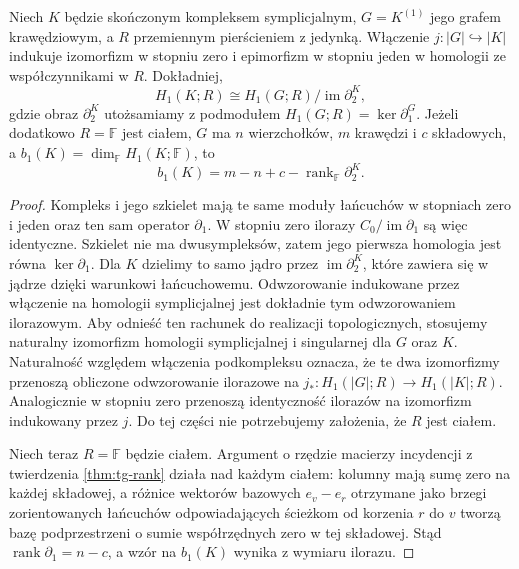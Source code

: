 \begin{stwierdzenie}
\label{prop:tg-skeleton-homology}
Niech $K$ będzie skończonym kompleksem symplicjalnym,
$G=K^{(1)}$ jego grafem krawędziowym, a $R$
przemiennym pierścieniem z jedynką.
Włączenie $j:|G|\hookrightarrow |K|$
indukuje izomorfizm w stopniu zero i epimorfizm
w stopniu jeden w homologii ze współczynnikami w $R$.
Dokładniej,
\[
H_1(K;R)\cong H_1(G;R)/\operatorname{im}\partial_2^K,
\]
gdzie obraz $\partial_2^K$ utożsamiamy z podmodułem
$H_1(G;R)=\ker\partial_1^G$.
Jeżeli dodatkowo $R=\mathbb F$ jest ciałem,
$G$ ma $n$ wierzchołków, $m$ krawędzi i $c$ składowych,
a $b_1(K)=\dim_{\mathbb F}H_1(K;\mathbb F)$, to
\[
b_1(K)=m-n+c-\operatorname{rank}_{\mathbb F}\partial_2^K.
\]
\end{stwierdzenie}
\begin{proof}
Kompleks i jego szkielet mają te same moduły
łańcuchów w stopniach zero i jeden oraz ten sam
operator $\partial_1$. W stopniu zero ilorazy
$C_0/\operatorname{im}\partial_1$ są więc identyczne.
Szkielet nie ma dwusympleksów, zatem jego pierwsza
homologia jest równa $\ker\partial_1$.
Dla $K$ dzielimy to samo jądro przez
$\operatorname{im}\partial_2^K$, które zawiera się
w jądrze dzięki warunkowi łańcuchowemu.
Odwzorowanie indukowane przez włączenie
na homologii symplicjalnej jest dokładnie tym
odwzorowaniem ilorazowym. Aby odnieść ten rachunek
do realizacji topologicznych, stosujemy naturalny
izomorfizm homologii symplicjalnej i singularnej
dla $G$ oraz $K$. Naturalność względem włączenia
podkompleksu oznacza, że te dwa izomorfizmy
przenoszą obliczone odwzorowanie ilorazowe na
$j_*:H_1(|G|;R)\to H_1(|K|;R)$.
Analogicznie w stopniu zero przenoszą identyczność
ilorazów na izomorfizm indukowany przez $j$.
Do tej części nie potrzebujemy założenia, że $R$
jest ciałem.

Niech teraz $R=\mathbb F$ będzie ciałem.
Argument o rzędzie macierzy incydencji
z twierdzenia \ref{thm:tg-rank} działa nad każdym
ciałem: kolumny mają sumę zero na każdej składowej,
a różnice wektorów bazowych $e_v-e_r$ otrzymane
jako brzegi zorientowanych łańcuchów odpowiadających
ścieżkom od korzenia $r$ do $v$ tworzą bazę
podprzestrzeni o sumie współrzędnych zero w tej
składowej. Stąd $\operatorname{rank}\partial_1=n-c$,
a wzór na $b_1(K)$ wynika z wymiaru ilorazu.
\end{proof}

